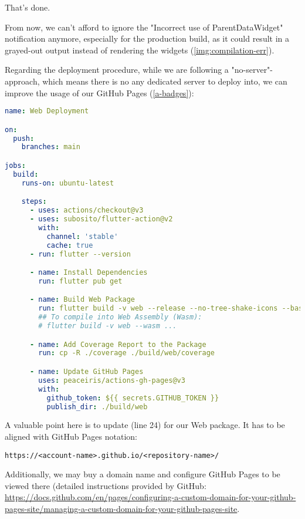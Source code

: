 \noindent That's done.

From now, we can't afford to ignore the "Incorrect use of ParentDataWidget" notification anymore, especially for the 
production build, as it could result in a grayed-out output instead of rendering the widgets (\cref{img:compilation-err}).

\noindent Regarding the deployment procedure, while we are following a "no-server"-approach, which means there is no any 
dedicated server to deploy into, we can improve the usage of our GitHub Pages (\ref{a-badges}):

\begin{lstlisting}[language=yaml]
name: Web Deployment

on:
  push:
    branches: main

jobs:
  build:
    runs-on: ubuntu-latest

    steps:
      - uses: actions/checkout@v3
      - uses: subosito/flutter-action@v2
        with:
          channel: 'stable'
          cache: true
      - run: flutter --version

      - name: Install Dependencies
        run: flutter pub get

      - name: Build Web Package
        run: flutter build -v web --release --no-tree-shake-icons --base-href="/app-finance/"
        ## To compile into Web Assembly (Wasm):
        # flutter build -v web --wasm ...

      - name: Add Coverage Report to the Package
        run: cp -R ./coverage ./build/web/coverage

      - name: Update GitHub Pages 
        uses: peaceiris/actions-gh-pages@v3
        with:
          github_token: ${{ secrets.GITHUB_TOKEN }}
          publish_dir: ./build/web
\end{lstlisting}

\noindent A valuable point here is to update  (line 24) for our Web package. It has to be aligned with 
GitHub Pages notation:

\begin{lstlisting}[language=terminal]
https://<account-name>.github.io/<repository-name>/
\end{lstlisting}

\noindent Additionally, we may buy a domain name and configure GitHub Pages to be viewed there (detailed instructions 
provided by GitHub: 
\href{https://docs.github.com/en/pages/configuring-a-custom-domain-for-your-github-pages-site/managing-a-custom-domain-for-your-github-pages-site}{https://docs.github.com/en/pages/configuring-a-custom-domain-for-your-github-pages-site/managing-a-custom-domain-for-your-github-pages-site}.


